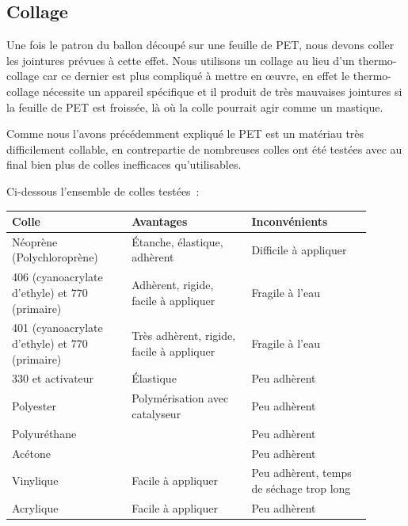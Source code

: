 \documentclass[a4paper,11pt]{article}
\begin{document}
\subsection{Collage}

Une fois le patron du ballon découpé sur une feuille de PET, nous devons coller les jointures prévues à cette effet. Nous utilisons un collage au lieu d'un thermo-collage car ce dernier est plus compliqué à mettre en œuvre, en effet le thermo-collage nécessite un appareil spécifique et il produit de très mauvaises jointures si la feuille de PET est froissée, là où la colle pourrait agir comme un mastique.

Comme nous l'avons précédemment expliqué le PET est un matériau très difficilement collable, en contrepartie de nombreuses colles ont été testées avec au final bien plus de colles inefficaces qu'utilisables.

Ci-dessous l'ensemble de colles testées~:

\begin{center}
  \begin{tabular}{|p{0.3\linewidth}|p{0.3\linewidth}|p{0.3\linewidth}|}
		\hline
		Colle & Avantages & Inconvénients \\
		\hline

		\rowcolor{OrangeT}
		Néoprène (Polychloroprène) &
		Étanche, élastique, adhèrent &
		Difficile à appliquer \\
		\hline

		\rowcolor{OrangeT}
		406 (cyanoacrylate d'ethyle) et 770 (primaire) &
		Adhèrent, rigide, facile à appliquer &
		Fragile à l'eau \\
		\hline

		\rowcolor{GreenT}
		401 (cyanoacrylate d'ethyle) et 770 (primaire) &
		Très adhèrent, rigide, facile à appliquer &
		Fragile à l'eau \\
		\hline

		\rowcolor{RedT}
		330 et activateur &
		Élastique &
		Peu adhèrent \\
		\hline

		\rowcolor{RedT}
		Polyester &
		Polymérisation avec catalyseur &
		Peu adhèrent \\
		\hline

		\rowcolor{RedT}
		Polyuréthane &
		& Peu adhèrent \\
		\hline

		\rowcolor{RedT}
		Acétone &
		& Peu adhèrent \\
		\hline

		\rowcolor{RedT}
		Vinylique &
		Facile à appliquer &
		Peu adhèrent, temps de séchage trop long \\
		\hline

		\rowcolor{RedT}
		Acrylique &
		Facile à appliquer &
		Peu adhèrent \\
		\hline
  \end{tabular}
\end{center}
\end{document}
